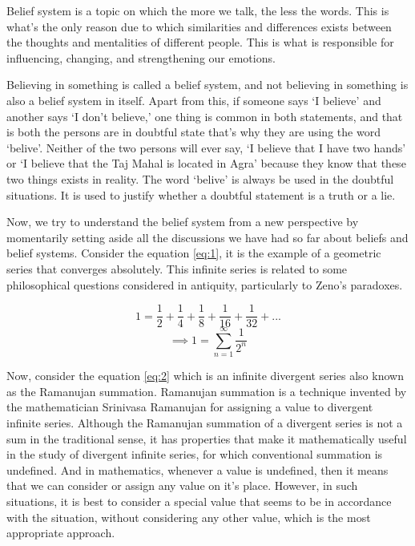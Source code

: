 Belief system is a topic on which the more we talk, the less the words. This is what's the only reason due to which similarities and differences exists between the thoughts and mentalities of different people. This is what is responsible for influencing, changing, and strengthening our emotions.

Believing in something is called a belief system, and not believing in something is also a belief system in itself. Apart from this, if someone says `I believe' and another says `I don't believe,' one thing is common in both statements, and that is both the persons are in doubtful state that's why they are using the word `belive'. Neither of the two persons will ever say, `I believe that I have two hands' or `I believe that the Taj Mahal is located in Agra' because they know that these two things exists in reality. The word `belive' is always be used in the doubtful situations. It is used to justify whether a doubtful statement is a truth or a lie.

Now, we try to understand the belief system from a new perspective by momentarily setting aside all the discussions we have had so far about beliefs and belief systems. Consider the equation \ref{eq:1}, it is the example of a geometric series that converges absolutely. This infinite series is related to some philosophical questions considered in antiquity, particularly to Zeno's paradoxes\cite{enwiki:1123380424}.
\vspace{1\baselineskip}

\[1 = \dfrac{1}{2} + \dfrac{1}{4} + \dfrac{1}{8} + \dfrac{1}{16} + \dfrac{1}{32} + ...\]
\begin{equation}\label{eq:1}
	\implies\boxed{1 = \sum\limits_{n = 1}^\infty\dfrac{1}{2^n}}
\end{equation}
\vspace{1\baselineskip}

Now, consider the equation \ref{eq:2} which is an infinite divergent series also known as the Ramanujan summation. Ramanujan summation is a technique invented by the mathematician Srinivasa Ramanujan for assigning a value to divergent infinite series. Although the Ramanujan summation of a divergent series is not a sum in the traditional sense, it has properties that make it mathematically useful in the study of divergent infinite series, for which conventional summation is undefined\cite{enwiki:1148245424}. And in mathematics, whenever a value is undefined, then it means that we can consider or assign any value on it's place. However, in such situations, it is best to consider a special value that seems to be in accordance with the situation, without considering any other value, which is the most appropriate approach.
\vspace{1\baselineskip}

